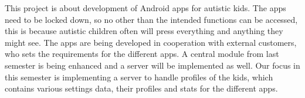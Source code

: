 This project is about development of Android apps for autistic kids. The apps need to be locked down, so no other than the intended functions can be accessed, this is because autistic children often will press everything and anything they might see. The apps are being developed in cooperation with external customers, who sets the requirements for the different apps. A central module from last semester is being enhanced and a server will be implemented as well. Our focus in this semester is implementing a server to handle profiles of the kids, which contains various settings data, their profiles and stats for the different apps.
